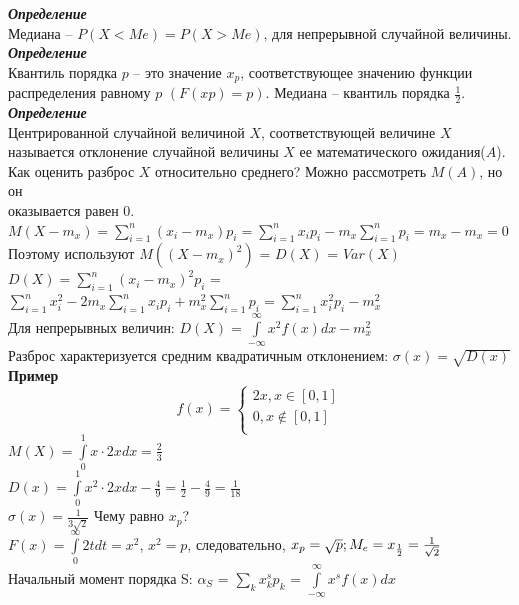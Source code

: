 \documentclass[russian, 12pt, fleqn]{article}
\begin{document}
\textit{\textbf{Определение}}\\
Медиана -- $P(X<Me) = P(X>Me)$, для непрерывной случайной величины.\\
\textit{\textbf{Определение}}\\
Квантиль порядка $p$ -- это значение $x_p$, соответствующее значению функции распределения равному $p$ $(F(xp)=p)$. Медиана -- квантиль порядка $\frac{1}{2}$.\\
\textit{\textbf{Определение}}\\
Центрированной случайной величиной $X$, соответствующей величине $X$ называется отклонение случайной величины $X$ ее математического ожидания($A$).
Как оценить разброс $X$ относительно среднего? Можно рассмотреть $M(A)$, но он\\ оказывается равен 0.\\
$M(X - m_x) = \sum\limits_{i=1}^{n}(x_i-m_x)p_i=\sum\limits_{i=1}^{n}x_ip_i - m_x\sum\limits_{i=1}^{n}p_i = m_x - m_x = 0$\\
Поэтому используют $M((X-m_x)^2)$ = $D(X)$ = $Var(X)$\\
$D(X)= \sum\limits_{i=1}^{n} (x_i - m_x)^2p_i$ = $\sum\limits_{i=1}^{n}x_i^2 - 2m_x\sum\limits_{i=1}^{n}x_ip_i + m_x^2\sum\limits_{i=1}^{n}p_i = \sum\limits_{i=1}^{n}x_i^2p_i - m_x^2$\\
Для непрерывных величин: $D(X) = \int\limits_{-\infty}^{\infty}x^2f(x)dx - m_x^2$\\
Разброс характеризуется средним квадратичным отклонением: $\sigma(x) = \sqrt{D(x)}$\\
\textbf{Пример\ }\\
\begin{equation} 
f(x)=
 \begin{cases}
   2x,  x \in [0, 1]\\
   0 , x \notin [0, 1]\\
 \end{cases}
\end{equation}
$M(X) = \int\limits_{0}^{1}x\cdot 2x d x  = \frac{2}{3}$\\
$D(x) = \int\limits_{0}^{1}x^2\cdot 2x d x - \frac{4}{9} = \frac{1}{2} - \frac{4}{9} = \frac{1}{18}$\\
$\sigma(x) = \frac{1}{3\sqrt{2}}$
Чему равно $x_p$?\\
$F(x) = \int\limits_{0}^{\infty}2tdt = x^2$, $x^2 = p$, следовательно, $x_p = \sqrt{p};\\
 M_e = x_\frac{1}{2} = \frac{1}{\sqrt{2}}$\\
Начальный момент порядка S: $\alpha_S$ = $\sum\limits_{k} x^s_kp_k$  = $\int\limits_{-\infty}^{\infty}x^sf(x)dx$\\
\end{document}
